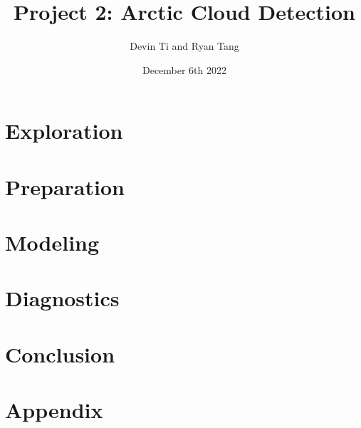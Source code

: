 \documentclass[11pt, letterpaper, journal]{IEEEtran}
\title{Project 2: Arctic Cloud Detection}
\author{Devin Ti and Ryan Tang}
\date{December 6th 2022}
\begin{document}
\maketitle

\begin{abstract}
\lipsum[2-4]
\end{abstract}

\section{Exploration}
\lipsum[2-4]

\section{Preparation}
\lipsum[2-4]

\section{Modeling}
\lipsum[2-4]

\section{Diagnostics}
\lipsum[2-4]

\section{Conclusion}
\lipsum[2-4]

\section{Appendix}
\lipsum[2-4]
\end{document}
